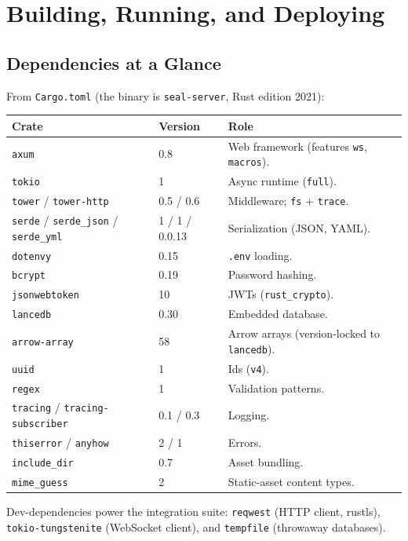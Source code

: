 \chapter{Building, Running, and Deploying}
\label{chap:build}

\section{Dependencies at a Glance}

From \verb|Cargo.toml| (the binary is \verb|seal-server|, Rust edition 2021):

\begin{center}
\begin{longtable}{@{}llp{}@{}}
\toprule
\textbf{Crate} & \textbf{Version} & \textbf{Role} \\
\midrule
\endhead
\verb|axum| & 0.8 & Web framework (features \verb|ws|, \verb|macros|). \\
\verb|tokio| & 1 & Async runtime (\verb|full|). \\
\verb|tower| / \verb|tower-http| & 0.5 / 0.6 & Middleware; \verb|fs| + \verb|trace|. \\
\verb|serde| / \verb|serde_json| / \verb|serde_yml| & 1 / 1 / 0.0.13 & Serialization (JSON, YAML). \\
\verb|dotenvy| & 0.15 & \verb|.env| loading. \\
\verb|bcrypt| & 0.19 & Password hashing. \\
\verb|jsonwebtoken| & 10 & JWTs (\verb|rust_crypto|). \\
\verb|lancedb| & 0.30 & Embedded database. \\
\verb|arrow-array| & 58 & Arrow arrays (version-locked to \verb|lancedb|). \\
\verb|uuid| & 1 & Ids (\verb|v4|). \\
\verb|regex| & 1 & Validation patterns. \\
\verb|tracing| / \verb|tracing-subscriber| & 0.1 / 0.3 & Logging. \\
\verb|thiserror| / \verb|anyhow| & 2 / 1 & Errors. \\
\verb|include_dir| & 0.7 & Asset bundling. \\
\verb|mime_guess| & 2 & Static-asset content types. \\
\bottomrule
\end{longtable}
\end{center}

Dev-dependencies power the integration suite: \verb|reqwest| (HTTP client, rustls),
\verb|tokio-tungstenite| (WebSocket client), and \verb|tempfile| (throwaway
databases).

